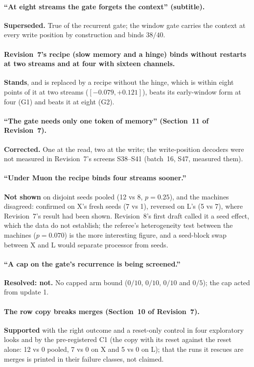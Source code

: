 \documentclass[11pt]{article}
\begin{document}
\paragraph{``At eight streams the gate forgets the context'' (subtitle).} \textbf{Superseded.} True of the recurrent gate; the window gate carries the context at every write position by construction and binds $38/40$.

\paragraph{Revision~7's recipe (slow memory and a hinge) binds without restarts at two streams and at four with sixteen channels.} \textbf{Stands}, and is replaced by a recipe without the hinge, which is within eight points of it at two streams ($[-0.079, +0.121]$), beats its early-window form at four (G1) and beats it at eight (G2).

\paragraph{``The gate needs only one token of memory'' (Section~11 of Revision~7).} \textbf{Corrected.} One at the read, two at the write; the write-position decoders were not measured in Revision~7's screens S38--S41 (batch~16, S47, measured them).

\paragraph{``Under Muon the recipe binds four streams sooner.''} \textbf{Not shown} on disjoint seeds pooled (12 vs 8, $p = 0.25$), and the machines disagreed: confirmed on X's fresh seeds (7 vs 1), reversed on L's (5 vs 7), where Revision~7's result had been shown. Revision~8's first draft called it a seed effect, which the data do not establish; the referee's heterogeneity test between the machines ($p = 0.070$) is the more interesting figure, and a seed-block swap between X and L would separate processor from seeds.

\paragraph{``A cap on the gate's recurrence is being screened.''} \textbf{Resolved: not.} No capped arm bound ($0/10$, $0/10$, $0/10$ and $0/5$); the cap acted from update 1.

\paragraph{The row copy breaks merges (Section~10 of Revision~7).} \textbf{Supported} with the right outcome and a reset-only control in four exploratory looks and by the pre-registered C1 (the copy with its reset against the reset alone: 12 vs 0 pooled, 7 vs 0 on X and 5 vs 0 on L); that the runs it rescues are merges is printed in their failure classes, not claimed.
\end{document}
